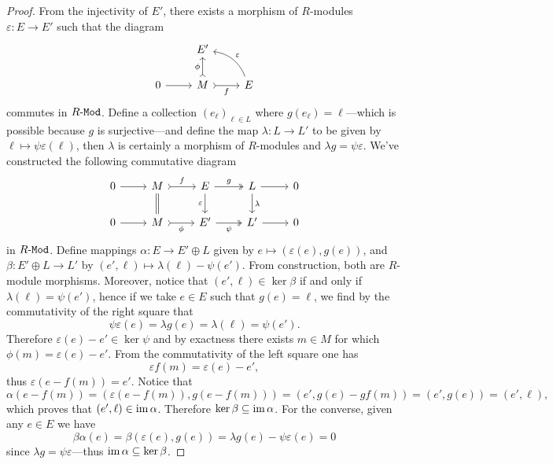 \begin{proof}
    From the injectivity of \(E'\), there exists a morphism of \(R\)-modules
    \(\varepsilon: E \to E'\) such that the diagram
    \[
        \begin{tikzcd}
            &E' & \\
            0 \ar[r]
            &M \ar[u, tail, "\phi"] \ar[r, tail, "f"']
            &E \ar[ul, bend right, "\varepsilon"']
        \end{tikzcd}
    \]
    commutes in \({R\text{-}\texttt{Mod}}\). Define a collection \((e_{\ell})_{\ell \in L}\) where
    \(g(e_{\ell}) = \ell\)---which is possible because \(g\) is surjective---and
    define the map \(\lambda: L \to L'\) to be given by
    \(\ell \mapsto \psi \varepsilon(\ell)\), then \(\lambda\) is certainly a
    morphism of \(R\)-modules and \(\lambda g = \psi \varepsilon\). We've
    constructed the following commutative diagram
    \[
        \begin{tikzcd}
            0 \ar[r]
            &M \ar[d, equals] \ar[r, tail, "f"]
            &E \ar[r, two heads, "g"] \ar[d, "\varepsilon"']
            &L \ar[r] \ar[d, "\lambda"] &0
            \\
            0 \ar[r] &M \ar[r, tail, "\phi"'] &E' \ar[r, two heads, "\psi"'] &L' \ar[r] &0
        \end{tikzcd}
    \]
    in \({R\text{-}\texttt{Mod}}\). Define mappings \(\alpha: E \to E' \oplus L\) given by
    \(e \mapsto (\varepsilon(e), g(e))\), and \(\beta: E' \oplus L \to L'\) by
    \((e', \ell) \mapsto \lambda(\ell) - \psi(e')\). From construction, both are
    \(R\)-module morphisms. Moreover, notice that \((e', \ell) \in \ker \beta\) if
    and only if \(\lambda(\ell) = \psi(e')\), hence if we take \(e \in E\) such that
    \(g(e) = \ell\), we find by the commutativity of the right square that
    \[
        \psi \varepsilon(e) = \lambda g(e) = \lambda(\ell) = \psi(e').
    \]
    Therefore \(\varepsilon(e) - e' \in \ker \psi\) and by exactness there exists
    \(m \in M\) for which \(\phi(m) = \varepsilon(e) - e'\). From the commutativity
    of the left square one has
    \[
        \varepsilon f(m) = \varepsilon(e) - e',
    \]
    thus \(\varepsilon(e - f(m)) = e'\). Notice that
    \[
        \alpha(e - f(m)) = (\varepsilon(e - f(m)), g(e - f(m)))
        = (e', g(e) - g f(m))
        = (e', g(e))
        = (e', \ell),
    \]
    which proves that \((e', \ell) \in \operatorname{im} \alpha\). Therefore
    \(\ker \beta \subseteq \operatorname{im} \alpha\). For the converse, given any \(e \in E\) we have
    \[
        \beta \alpha(e) = \beta(\varepsilon(e), g(e))
        = \lambda g(e) - \psi \varepsilon(e)
        = 0
    \]
    since \(\lambda g = \psi \varepsilon\)---thus
    \(\operatorname{im} \alpha \subseteq \ker \beta\).


\end{proof}
